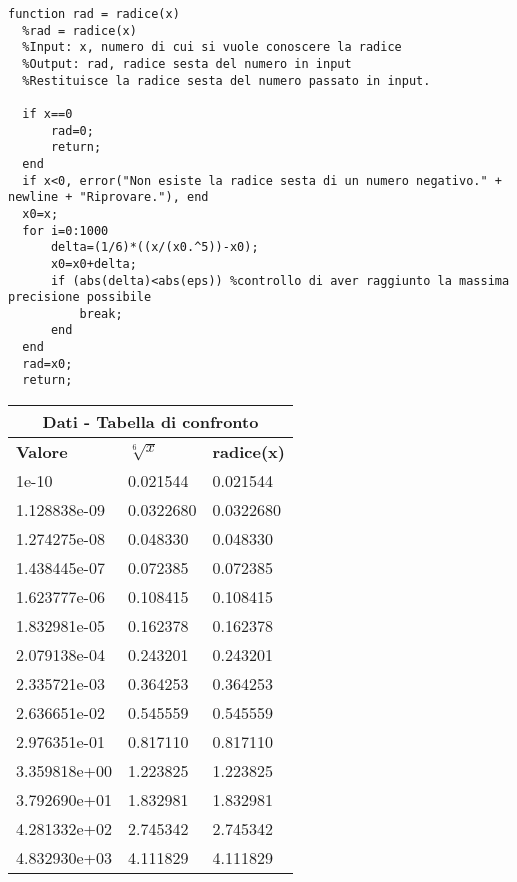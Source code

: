 \documentclass[10pt,a4paper]{article}
\begin{document}
\begin{lstlisting}[style=Matlab-editor]
  function rad = radice(x)
  %rad = radice(x)
  %Input: x, numero di cui si vuole conoscere la radice
  %Output: rad, radice sesta del numero in input
  %Restituisce la radice sesta del numero passato in input.
  
  if x==0
      rad=0;
      return;
  end
  if x<0, error("Non esiste la radice sesta di un numero negativo." + newline + "Riprovare."), end
  x0=x;
  for i=0:1000
      delta=(1/6)*((x/(x0.^5))-x0);
      x0=x0+delta;
      if (abs(delta)<abs(eps)) %controllo di aver raggiunto la massima precisione possibile
          break; 
      end
  end
  rad=x0;
  return;
\end{lstlisting}
\begin{center}
  \begin{tabular}{ |p{2.7cm}||p{2.7cm}|p{2.7cm}| }
    \hline
    \multicolumn{3}{|c|}{ \textbf{Dati - Tabella di confronto}} \\
    \hline
    \textbf{Valore} & $ \sqrt[6]{x} $ & \textbf{radice(x)}      \\
    \hline
    1e-10           & 0.021544        & 0.021544                \\
    1.128838e-09    & 0.0322680       & 0.0322680               \\
    1.274275e-08    & 0.048330        & 0.048330                \\
    1.438445e-07    & 0.072385        & 0.072385                \\
    1.623777e-06    & 0.108415        & 0.108415                \\
    1.832981e-05    & 0.162378        & 0.162378                \\
    2.079138e-04    & 0.243201        & 0.243201                \\
    2.335721e-03    & 0.364253        & 0.364253                \\
    2.636651e-02    & 0.545559        & 0.545559                \\
    2.976351e-01    & 0.817110        & 0.817110                \\
    3.359818e+00    & 1.223825        & 1.223825                \\
    3.792690e+01    & 1.832981        & 1.832981                \\
    4.281332e+02    & 2.745342        & 2.745342                \\
    4.832930e+03    & 4.111829        & 4.111829                \\

\end{tabular}
\end{center}
\end{document}
